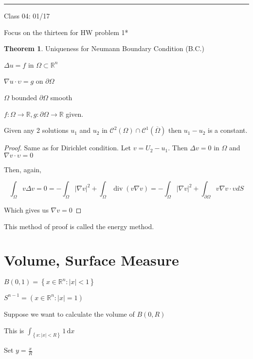 \documentclass{article}
\theoremstyle{definition}
\newtheorem{theorem}{Theorem}
\begin{document}
\hrule
\hfil

Class 04: 01/17

Focus on the thirteen for HW problem 1*

\begin{theorem}

    Uniqueness for Neumann Boundary Condition (B.C.)

    \(\Delta u=f\) in \(\Omega \subset \mathbb{R} ^n\)  

    \(\nabla u \cdot \upsilon =g\) on \(\partial \Omega \)  

    \(\Omega\) bounded \(\partial \Omega \) smooth

    \(f:\Omega \to \mathbb{R} ,g:\partial \Omega \to \mathbb{R} \) given.

    Given any 2 solutions \(u_1\) and \(u_2\) in \(\mathcal{C} ^2(\Omega )\cap \mathcal{C} ^1(\overline{\Omega } )\)   then \(u_1 - u_2\) is a constant.

\end{theorem}

\begin{proof}
    Same as for Dirichlet condition. Let \(v=U_2 - u_1\). Then \(\Delta v=0\) in \(\Omega \) and \(\nabla v\cdot \upsilon=0\)
    
    Then, again,

    \[
        \int _\Omega v \Delta v = 0 =-\int_\Omega |\nabla v|^2 + \int _\Omega \operatorname{div}(v \nabla v) =-\int _\Omega |\nabla v|^2+\int _{\partial \Omega } v\nabla v\cdot \upsilon dS
    \]

    Which gives us \(\nabla v=0 \) 

\end{proof}

This method of proof is called the energy method.

\section*{Volume, Surface Measure}

\(B(0,1)=\left\{ x\in\mathbb{R} ^n:\vert x \vert <1 \right\} \) 

\(S^{n-1} = \left( x\in\mathbb{R} ^n:\vert x \vert =1 \right) \) 

Suppose we want to calculate the volume of \(B(0,R)\)

This is \(\displaystyle \int_{\left\{ x:\vert x \vert <R \right\} }^{} 1  \,\mathrm{d}x  \)

Set \(y=\frac{x}{R}\) 
\end{document}
